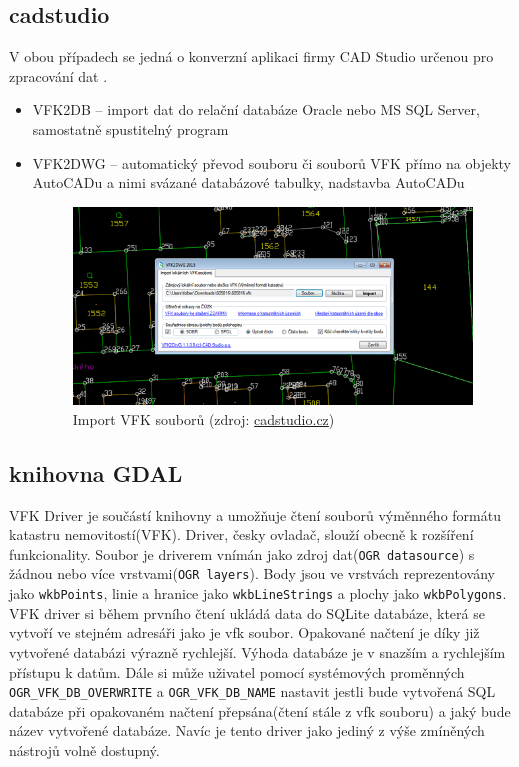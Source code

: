 \subsection{cadstudio}
V obou případech se jedná o konverzní aplikaci firmy CAD Studio
určenou pro zpracování dat .
\begin{itemize}[leftmargin=50pt]
\item VFK2DB -- import dat do relační databáze Oracle nebo MS SQL Server, samostatně spustitelný program \cite{vfk2db} %
\item VFK2DWG -- automatický převod souboru či souborů VFK přímo na objekty AutoCADu a nimi svázané databázové tabulky, nadstavba AutoCADu \cite{vfk2dwg}

\begin{figure}[H]
	 \centering
      \includegraphics[width=14cm]{./pictures/vfk2dwg.png}
      \caption{Import VFK souborů (zdroj:
\href{http://www.cadstudio.cz/img/vfk2dwg11.gif}{cadstudio.cz})}
      \label{fig:cadstudio}
  \end{figure}
\end{itemize}
\subsection{knihovna GDAL}
\label{subsec:gdal_vfk}
VFK Driver je součástí knihovny  a umožňuje čtení souborů
výměnného formátu katastru nemovitostí(VFK). Driver, česky ovladač,
slouží obecně k rozšíření funkcionality. Soubor  je driverem
vnímán jako zdroj dat(\verb|OGR datasource|) s žádnou nebo více
vrstvami(\verb|OGR layers|). Body jsou ve vrstvách reprezentovány jako
\verb|wkbPoints|, linie a hranice jako \verb|wkbLineStrings| a plochy
jako \verb|wkbPolygons|. VFK driver si během prvního čtení ukládá data
do SQLite databáze, která se vytvoří ve stejném adresáři jako je vfk
soubor. Opakované načtení je díky již vytvořené databázi výrazně
rychlejší. Výhoda databáze je v snazším a rychlejším přístupu k
datům. Dále si může uživatel pomocí systémových proměnných
\verb|OGR_VFK_DB_OVERWRITE| a \verb|OGR_VFK_DB_NAME| nastavit jestli
bude vytvořená SQL databáze při opakovaném načtení přepsána(čtení
stále z vfk souboru) a jaký bude název vytvořené databáze. Navíc je
tento driver jako jediný z výše zmíněných nástrojů volně
dostupný. \cite{vfk_driver}

